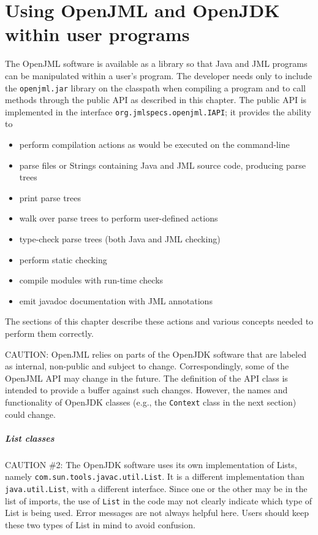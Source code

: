 
\chapter{Using OpenJML and OpenJDK within user programs}

The OpenJML software is available as a library so that Java and JML programs can be manipulated 
within a user's program. The developer needs only to include the {\tt openjml.jar} library on 
the classpath when compiling a program and to call methods through the public API as described in this chapter.
The public API is implemented in the interface {\tt org.jmlspecs.openjml.IAPI}; it provides the ability to
\begin{itemize}
\item perform compilation actions as would be executed on the command-line
\item parse files or Strings containing Java and JML source code, producing parse trees
\item print parse trees
\item walk over parse trees to perform user-defined actions
\item type-check parse trees (both Java and JML checking)
\item perform static checking
\item compile modules with run-time checks
\item emit javadoc documentation with JML annotations
\end{itemize}
The sections of this chapter describe these actions and various concepts needed to perform them correctly.

CAUTION: OpenJML relies on parts of the OpenJDK software that are labeled as internal, non-public and subject to
change. Correspondingly, some of the OpenJML API may change in the future. The definition of the API class is 
intended to provide a buffer against such changes. However, the names and functionality of OpenJDK classes (e.g.,
the {\tt Context} class in the next section) could change.

\paragraph{List classes}
CAUTION \#2: The OpenJDK software uses its own implementation of Lists, namely {\tt com.sun.tools.javac.util.List}. 
It is a different implementation than {\tt java.util.List}, with a different interface. Since one or the other may
 be in the list of imports, the use of {\tt List} in the code may not clearly indicate which type of List is being
 used. Error messages are not always helpful here. Users should keep these two types of List in mind to avoid 
 confusion.

